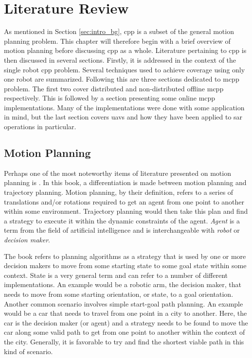 \chapter{Literature Review}
\label{chp:back}
As mentioned in Section \ref{sec:intro_bg}, \acl{cpp} is a subset of the general motion planning problem. This chapter will therefore begin with a brief overview of motion planning before discussing \acs{cpp} as a whole. Literature pertaining to \acs{cpp} is then discussed in several sections. Firstly, it is addressed in the context of the single robot \acs{cpp} problem. Several techniques used to achieve coverage using only one robot are summarized. Following this are three sections dedicated to \acf{mcpp} problem. The first two cover distributed and non-distributed offline \acs{mcpp} respectively. This is followed by a section presenting some online \acs{mcpp} implementations. Many of the implementations were done with some application in mind, but the last section covers \acsp{uav} and how they have been applied to \acs{sar} operations in particular.

\section{Motion Planning}
Perhaps one of the most noteworthy items of literature presented on motion planning is \cite{Lavalle2006}. In this book, a differentiation is made between motion planning and trajectory planning. Motion planning, by their definition, refers to a series of translations and/or rotations required to get an agent from one point to another within some environment. Trajectory planning would then take this plan and find a strategy to execute it within the dynamic constraints of the agent. \emph{Agent} is a term from the field of artificial intelligence and is interchangeable with \emph{robot} or \emph{decision maker}.

The book refers to planning algorithms as a strategy that is used by one or more decision makers to move from some starting state to some goal state within some context. State is a very general term and can refer to a number of different implementations. An example would be a robotic arm, the decision maker, that needs to move from some starting orientation, or state, to a goal orientation. Another common scenario involves simple start-goal path planning. An example would be a car that needs to travel from one point in a city to another. Here, the car is the decision maker (or agent) and a strategy needs to be found to move the car along some valid path to get from one point to another within the context of the city. Generally, it is favorable to try and find the shortest viable path in this kind of scenario.

